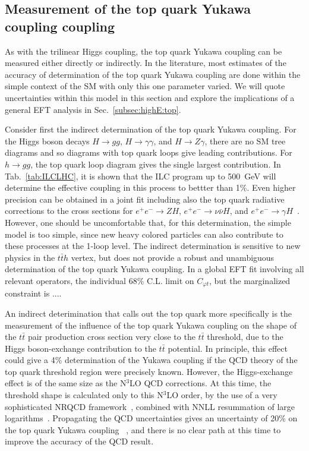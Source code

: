 \subsection{Measurement of the top quark Yukawa coupling coupling}
\label{subsec:top:topYukawa}


As with the trilinear Higgs coupling, the top quark Yukawa coupling can be
measured either directly or indirectly.  In the literature, most
estimates of the accuracy of determination of the top quark Yukawa
coupling are done within the simple context of the SM with only this
one parameter varied. We will quote uncertainties
within this model in this section and explore the implications of a general 
EFT analysis in Sec.~\ref{subsec:highE:top}.

Consider first the indirect determination of the top quark Yukawa coupling.
   For the Higgs boson decays
$H\to gg$, $H\to \gamma\gamma$, and $H\to Z \gamma$, there are no SM tree
diagrams
and so diagrams with top quark loops give leading contributions.  For
$h\to gg$, the top quark loop diagram gives the single largest
contribution.   In Tab.~\ref{tab:ILCLHC}, it is shown that the ILC
program up to 
500~GeV will determine the effective coupling in this process to bettter
than 1\%. Even higher precision can be obtained in a joint fit
including also the top quark radiative corrections to the cross
sections for $e^+e^- \rightarrow ZH$, $e^+e^- \rightarrow \nu\bar\nu
H$, and $e^+e^- \to  \gamma H$~\cite{Boselli:2018zxr}. However, one
should be uncomfortable that, for this determination, the simple model is
too simple, since new heavy colored particles can also contribute to
these processes at the 1-loop level. The indirect determination is 
sensitive to new physics in the $t\bar{t}h$ vertex, but does not provide 
a robust and unambiguous determination of the top quark Yukawa coupling. 
In a global EFT fit involving all relevant operators, the individual 68\% 
C.L. limit on $C_{\varphi t}$, but the marginalized constraint is ....

An indirect deterimination that calls out the top quark more
specifically is the measurement of the influence of the top quark
Yukawa coupling on the shape of the  $t\bar{t}$ pair production 
cross section very close to the $t\bar{t}$ threshold, due to the Higgs
boson-exchange contribution to the $t\bar t$ potential. In principle,
this effect could give a 4\% determination of the Yukawa coupling if
the QCD  theory of the top quark threshold region were precisely
known.   However, the Higgs-exchange effect is of the same size as
the N$^3$LO QCD corrections.  At this time, the threshold shape is
calculated only to this N$^3$LO order, by the use of a very sophisticated
NRQCD framework~\cite{Beneke:2015kwa}, combined with NNLL resummation of
large logarithms~\cite{Hoang:2013uda}.   Propagating the QCD
uncertainties gives an uncertainty of 20\% on the top quark Yukawa
coupling~\cite{Vos:2016til} , and there is no clear path at this time to improve the
accuracy of the QCD result.

